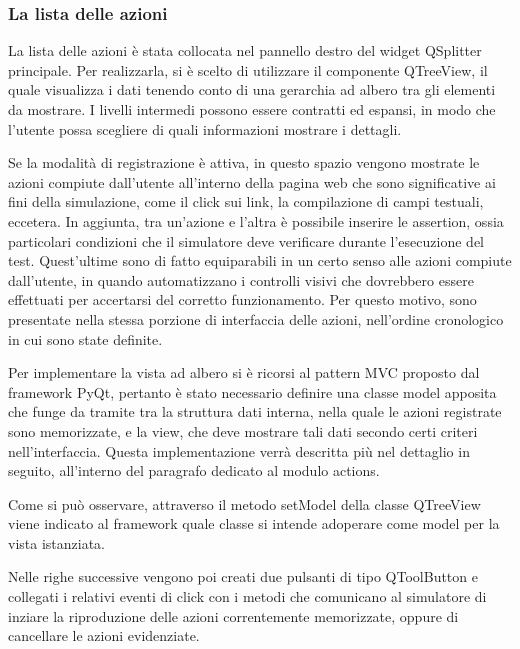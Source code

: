\documentclass[12pt]{toptesi}
\begin{document}
\subsubsection{La lista delle azioni}

La lista delle azioni è stata collocata nel pannello destro del widget QSplitter principale. Per realizzarla, si è scelto di utilizzare il componente QTreeView, il quale visualizza i dati tenendo conto di una gerarchia ad albero tra gli elementi da mostrare. I livelli intermedi possono essere contratti ed espansi, in modo che l'utente possa scegliere di quali informazioni mostrare i dettagli. 

Se la modalità di registrazione è attiva, in questo spazio vengono mostrate le azioni compiute dall'utente all'interno della pagina web che sono significative ai fini della simulazione, come il click sui link, la compilazione di campi testuali, eccetera. In aggiunta, tra un'azione e l'altra è possibile inserire le assertion, ossia particolari condizioni che il simulatore deve verificare durante l'esecuzione del test. Quest'ultime sono di fatto equiparabili in un certo senso alle azioni compiute dall'utente, in quando automatizzano i controlli visivi che dovrebbero essere effettuati per accertarsi del corretto funzionamento. Per questo motivo, sono presentate nella stessa porzione di interfaccia delle azioni, nell'ordine cronologico in cui sono state definite.

Per implementare la vista ad albero si è ricorsi al pattern MVC proposto dal framework PyQt, pertanto è stato necessario definire una classe model apposita che funge da tramite tra la struttura dati interna, nella quale le azioni registrate sono memorizzate, e la view, che deve mostrare tali dati secondo certi criteri nell'interfaccia. Questa implementazione verrà descritta più nel dettaglio in seguito, all'interno del paragrafo dedicato al modulo actions.



Come si può osservare, attraverso il metodo setModel della classe QTreeView viene indicato al framework quale classe si intende adoperare come model per la vista istanziata.

Nelle righe successive vengono poi creati due pulsanti di tipo QToolButton e collegati i relativi eventi di click con i metodi che comunicano al simulatore di inziare la riproduzione delle azioni correntemente memorizzate, oppure di cancellare le azioni evidenziate.
\end{document}
